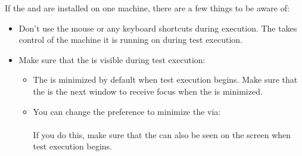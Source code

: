 

If the \ite{} and \gdagent{} are installed on one machine, there are a few things to be aware of:
\begin{itemize}
\item Don't use the mouse or any keyboard shortcuts during execution. The \gdaut{} takes control of the machine it is running on during test execution.
\item Make sure that the \gdaut{} is visible during test execution:
\begin{itemize}
\item The \ite{} is minimized by default when test execution begins. Make sure that the \gdaut{} is the next window to receive focus when the \ite{}  is minimized. 
\item You can change the preference to minimize the \ite{}  via:\\
\\
If you do this, make sure that the \gdaut{} can also be seen on the screen when test execution begins. 
 \end{itemize}
\end{itemize}
